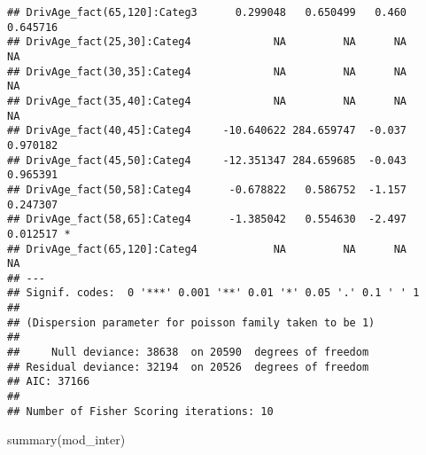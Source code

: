 \documentclass[
]{article}
\newenvironment{Shaded}{\begin{snugshade}}{\end{snugshade}}
\newcommand{\FunctionTok}[1]{\textcolor[rgb]{0.00,0.00,0.00}{#1}}
\newcommand{\NormalTok}[1]{#1}
\begin{document}
\begin{verbatim}
## DrivAge_fact(65,120]:Categ3      0.299048   0.650499   0.460 0.645716    
## DrivAge_fact(25,30]:Categ4             NA         NA      NA       NA    
## DrivAge_fact(30,35]:Categ4             NA         NA      NA       NA    
## DrivAge_fact(35,40]:Categ4             NA         NA      NA       NA    
## DrivAge_fact(40,45]:Categ4     -10.640622 284.659747  -0.037 0.970182    
## DrivAge_fact(45,50]:Categ4     -12.351347 284.659685  -0.043 0.965391    
## DrivAge_fact(50,58]:Categ4      -0.678822   0.586752  -1.157 0.247307    
## DrivAge_fact(58,65]:Categ4      -1.385042   0.554630  -2.497 0.012517 *  
## DrivAge_fact(65,120]:Categ4            NA         NA      NA       NA    
## ---
## Signif. codes:  0 '***' 0.001 '**' 0.01 '*' 0.05 '.' 0.1 ' ' 1
## 
## (Dispersion parameter for poisson family taken to be 1)
## 
##     Null deviance: 38638  on 20590  degrees of freedom
## Residual deviance: 32194  on 20526  degrees of freedom
## AIC: 37166
## 
## Number of Fisher Scoring iterations: 10
\end{verbatim}

\begin{Shaded}
\begin{Highlighting}[]
\FunctionTok{summary}\NormalTok{(mod\_inter)}
\end{Highlighting}
\end{Shaded}
\end{document}
